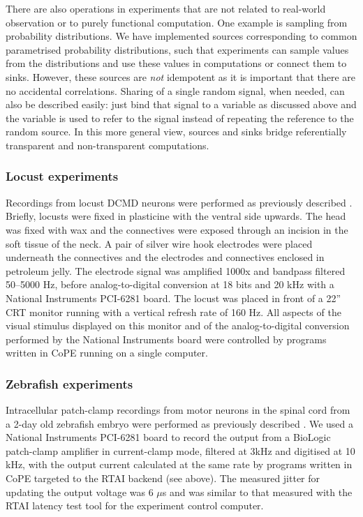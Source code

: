 There are also operations in experiments that are not related to real-world
observation or to purely functional computation. One example is sampling from
probability distributions. We have implemented sources corresponding to common
parametrised probability distributions, such that experiments can sample
values from the distributions and use these values in computations or
connect them to sinks. However, these sources are \emph{not} idempotent as it
is important that there are no accidental correlations. Sharing of a single random
signal, when needed, can also be described easily: just bind that signal to a
variable as discussed above and the variable is used to refer to the signal
instead of repeating the reference to the random source. In this more general
view, sources and sinks bridge referentially transparent and non-transparent
computations.

\subsubsection*{Locust experiments}

Recordings from locust DCMD neurons were performed as previously
described \cite{Matheson2004}. Briefly, locusts were fixed in
plasticine with the ventral side upwards. The head was fixed with wax
and the connectives were exposed through an
incision in the soft tissue of the neck. A pair of silver wire hook
electrodes were placed underneath the connectives and the electrodes
and connectives enclosed in petroleum jelly. The electrode signal was
amplified 1000x and bandpass filtered 50--5000 Hz, before
analog-to-digital conversion at 18 bits and 20 kHz with a National
Instruments PCI-6281 board. The locust was placed in front of a 22''
CRT monitor running with a vertical refresh rate of 160 Hz. All
aspects of the visual stimulus displayed on this monitor and of
the analog-to-digital conversion performed by the National Instruments
board were controlled by programs written in 
CoPE running on a single computer.

\subsubsection*{Zebrafish experiments}

Intracellular patch-clamp recordings from motor neurons in the spinal
cord from a 2-day old zebrafish embryo were performed as previously
described \cite{McDearmid2006}. We used a National Instruments PCI-6281
board to
record the output from a BioLogic patch-clamp amplifier in
current-clamp mode, filtered at 3kHz and digitised at 10 kHz, with the
output current calculated at the same rate by programs written in
CoPE targeted to the RTAI backend (see
above). The measured jitter for updating the output voltage was 6
$\mu$s and was similar to that measured with the RTAI latency test
tool for the experiment control computer.

